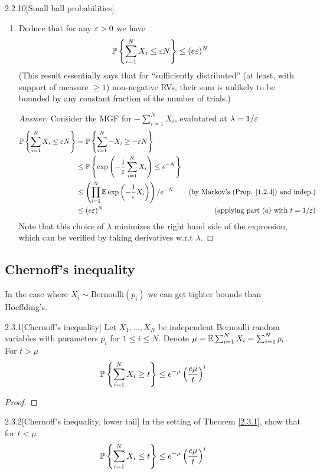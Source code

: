 {\begin{ex}{2.2.10}[Small ball probabilities]
\begin{enumerate}[label=(\alph*)]
\item Deduce that for any $\varepsilon > 0$ we have
\begin{align*}
    \mathbb{P} \left\{\sum_{i=1}^N X_i \leq \varepsilon N\right\} \leq (e\varepsilon)^N
\end{align*}
(This result essentially says that for ``sufficiently distributed'' (at least, with support of measure $\geq 1$) non-negative RVs, their sum is unlikely to be bounded by any constant fraction of the number of trials.)
\begin{proof}[Answer]
Consider the MGF for $-\sum_{i=1}^N X_i$, evalutated at $\lambda = 1/\varepsilon$
\begin{align*}
    \mathbb{P} \left\{\sum_{i=1}^N X_i \leq \varepsilon N\right\} &= \mathbb{P} \left\{\sum_{i=1}^N -X_i \geq -\varepsilon N\right\} \\
    &\leq \mathbb{P} \left\{\exp\left(-\frac 1 {\varepsilon}\sum_{i=1}^N X_i\right) \leq e^ {- N }\right\} \\
    &\leq\left(\prod_{i=1}^N \mathbb{E} \exp\left(-\frac1{\varepsilon} X_i\right)\right) /e^{-N} &\text{(by Markov's (Prop. \ref{1.2.4}) and indep.)} \\
    &\leq (e\varepsilon)^N &\text{(applying part (a) with $t=1/\varepsilon$)}
\end{align*}
Note that this choice of $\lambda$ minimizes the right hand side of the expression, which can be verified by taking derivatives w.r.t $\lambda$.
\end{proof}
\end{enumerate}
\end{ex}


\subsection{Chernoff's inequality}

In the case where $X_i \sim \text{Bernoulli}(p_i)$ we can get tighter bounds than Hoeffding's.

\begin{thm}{2.3.1}[Chernoff's inequality]\label{2.3.1}
Let $X_1,...,X_N$ be independent Bernoulli random variables with parameters $p_i$ for $1 \leq i \leq N$. Denote $\mu = \mathbb{E}\sum_{i=1}^N X_i = \sum_{i=1}^N p_i$. For $t>\mu$
\begin{align*}
    \mathbb{P} \left\{\sum_{i=1}^N X_i \geq t \right\} \leq e^{-\mu}\left(\frac {e \mu} {t}\right)^t
\end{align*}
\end{thm}
\begin{proof}
\end{proof}

\begin{ex}{2.3.2}[Chernoff's inequality, lower tail]\label{2.3.2}
In the setting of Theorem \ref{2.3.1}, show that for $t < \mu$
\begin{align*}
    \mathbb{P} \left\{\sum_{i=1}^N X_i \leq t \right\} \leq e^{-\mu}\left(\frac {e \mu} {t}\right)^t
\end{align*}
\end{ex}

}
